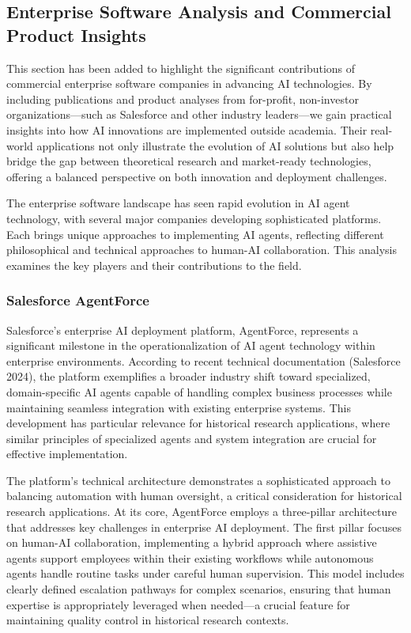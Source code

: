 \documentclass[
]{article}
\begin{document}
\subsection{Enterprise Software Analysis and Commercial Product
Insights}\label{enterprise-software-analysis-and-commercial-product-insights}

This section has been added to highlight the significant contributions
of commercial enterprise software companies in advancing AI
technologies. By including publications and product analyses from
for-profit, non-investor organizations---such as Salesforce and other
industry leaders---we gain practical insights into how AI innovations
are implemented outside academia. Their real-world applications not only
illustrate the evolution of AI solutions but also help bridge the gap
between theoretical research and market-ready technologies, offering a
balanced perspective on both innovation and deployment challenges.

The enterprise software landscape has seen rapid evolution in AI agent
technology, with several major companies developing sophisticated
platforms. Each brings unique approaches to implementing AI agents,
reflecting different philosophical and technical approaches to human-AI
collaboration. This analysis examines the key players and their
contributions to the field.

\subsubsection{Salesforce AgentForce}\label{salesforce-agentforce}

Salesforce's enterprise AI deployment platform, AgentForce, represents a
significant milestone in the operationalization of AI agent technology
within enterprise environments. According to recent technical
documentation (Salesforce 2024), the platform exemplifies a broader
industry shift toward specialized, domain-specific AI agents capable of
handling complex business processes while maintaining seamless
integration with existing enterprise systems. This development has
particular relevance for historical research applications, where similar
principles of specialized agents and system integration are crucial for
effective implementation.

The platform's technical architecture demonstrates a sophisticated
approach to balancing automation with human oversight, a critical
consideration for historical research applications. At its core,
AgentForce employs a three-pillar architecture that addresses key
challenges in enterprise AI deployment. The first pillar focuses on
human-AI collaboration, implementing a hybrid approach where assistive
agents support employees within their existing workflows while
autonomous agents handle routine tasks under careful human supervision.
This model includes clearly defined escalation pathways for complex
scenarios, ensuring that human expertise is appropriately leveraged when
needed---a crucial feature for maintaining quality control in historical
research contexts.
\end{document}
